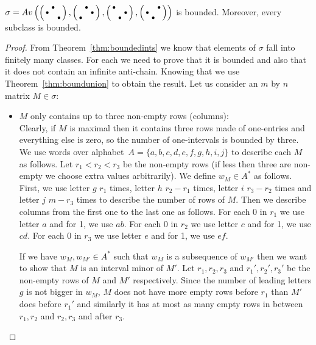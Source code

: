 \begin{thm}
$\sigma=Av\left(\left(\begin{smallmatrix} &\bullet& \\\bullet& & \\ & &\bullet\end{smallmatrix}\right),\left(\begin{smallmatrix} &\bullet& \\ & &\bullet\\\bullet& & \end{smallmatrix}\right),\left(\begin{smallmatrix}\bullet& & \\ & &\bullet\\ &\bullet& \end{smallmatrix}\right),\left(\begin{smallmatrix} & &\bullet\\\bullet& & \\ &\bullet& \end{smallmatrix}\right)\right)$ is bounded. Moreover, every subclass is bounded.
\end{thm}
\begin{proof}
From Theorem~\ref{thm:boundedints} we know that elements of $\sigma$ fall into finitely many classes. For each we need to prove that it is bounded and also that it does not contain an infinite anti-chain. Knowing that we use Theorem~\ref{thm:boundunion} to obtain the result. Let us consider an $m$ by $n$ matrix $M\in\sigma$:
\begin{itemize}
	\item $M$ only contains up to three non-empty rows (columns):\\
		Clearly, if $M$ is maximal then it contains three rows made of one-entries and everything else is zero, so the number of one-intervals is bounded by three.\\
		
		We use words over alphabet~$A=\{a,b,c,d,e,f,g,h,i,j\}$ to describe each $M$ as follows. Let $r_1<r_2<r_3$ be the non-empty rows (if less then three are non-empty we choose extra values arbitrarily). We define $w_M\in A^*$ as follows. First, we use letter $g$ $r_1$ times, letter $h$ $r_2-r_1$ times, letter $i$ $r_3-r_2$ times and letter $j$ $m-r_3$ times to describe the number of rows of $M$. Then we describe columns from the first one to the last one as follows. For each 0 in $r_1$ we use letter $a$ and for 1, we use $ab$. For each 0 in $r_2$ we use letter $c$ and for 1, we use $cd$. For each 0 in $r_3$ we use letter $e$ and for 1, we use $ef$.
		
		If we have $w_M,w_{M'}\in A^*$ such that $w_M$ is a subsequence of $w_{M'}$ then we want to show that $M$ is an interval minor of $M'$. Let $r_1,r_2,r_3$ and $r_1',r_2',r_3'$ be the non-empty rows of $M$ and $M'$ respectively. Since the number of leading letters $g$ is not bigger in $w_M$, $M$ does not have more empty rows before $r_1$ than $M'$ does before $r_1'$ and similarly it has at most as many empty rows in between $r_1,r_2$ and $r_2,r_3$ and after $r_3$.


\end{itemize}
\end{proof}
